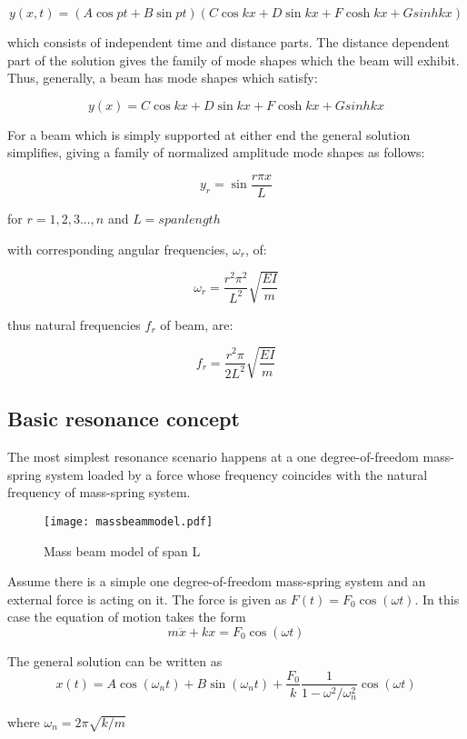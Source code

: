 \begin{appendices}
$$y(x,t) = (A\cos pt+B\sin pt)(C\cos kx + D\sin kx + F\cosh kx + Gsinh kx)$$

which consists of independent time and distance parts. The distance dependent part of the solution gives the family of mode shapes which the beam will exhibit. Thus, generally, a beam has mode shapes which satisfy:

$$y(x) = C\cos kx + D\sin kx + F\cosh kx + Gsinh kx $$

For a beam which is simply supported at either end the general solution simplifies, giving a family of normalized amplitude mode shapes as follows:

$$y_r = \sin \frac{r\pi x}{L}$$

for $r = 1,2,3...,n$ and $L = span length$

with corresponding angular frequencies, $\omega_r$, of:

$$\omega_r = \frac{r^2 \pi^2}{L^2}\sqrt{\frac{EI}{m}}$$

thus natural frequencies $f_r$ of beam, are:

$$f_r = \frac{r^2 \pi}{2L^2}\sqrt{\frac{EI}{m}}$$

\subsection{Basic resonance concept}
The most simplest resonance scenario happens at a one degree-of-freedom mass-spring system loaded by a force whose frequency coincides with the natural frequency of mass-spring system.
\begin{figure}[h]
	\centering
	\texttt{[image: massbeammodel.pdf]}
	\caption{Mass beam model of span L}
	\label{fig:massbeammodel}
\end{figure}

Assume there is a simple one degree-of-freedom mass-spring system and an external force is acting on it. The force is given as $F(t)= F_0 \cos(\omega t)$. In this case the equation of motion takes the form
\begin{equation}
	m\ddot{x} + kx = F_0 \cos(\omega t)
\end{equation}

The general solution can be written as
\begin{equation}
	x(t) = A\cos(\omega_n t)+B\sin(\omega_n t) +\frac{F_0}{k}\frac{1}{1-\omega^2/\omega_n^2}\cos(\omega t)
\end{equation}

where $\omega_n = 2\pi\sqrt{k/m}$


\end{appendices}
